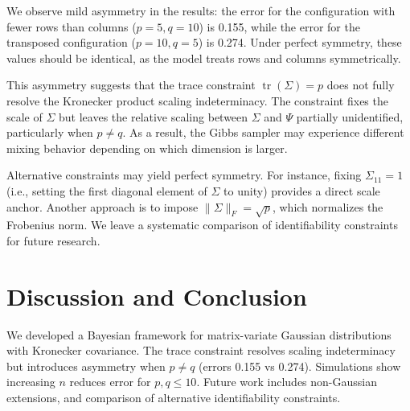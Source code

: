 \documentclass[twoside]{article}
\begin{document}
\noindent We observe mild asymmetry in the results: the error for the configuration with fewer rows than columns ($p=5,q=10$) is 0.155, while the error for the transposed configuration ($p=10,q=5$) is 0.274. Under perfect symmetry, these values should be identical, as the model treats rows and columns symmetrically.

\noindent This asymmetry suggests that the trace constraint $\operatorname{tr}(\Sigma)=p$ does not fully resolve the Kronecker product scaling indeterminacy. The constraint fixes the scale of $\Sigma$ but leaves the relative scaling between $\Sigma$ and $\Psi$ partially unidentified, particularly when $p \neq q$. As a result, the Gibbs sampler may experience different mixing behavior depending on which dimension is larger.

\noindent Alternative constraints may yield perfect symmetry. For instance, fixing $\Sigma_{11}=1$ (i.e., setting the first diagonal element of $\Sigma$ to unity) provides a direct scale anchor. Another approach is to impose $\|\Sigma\|_F = \sqrt{p}$, which normalizes the Frobenius norm. We leave a systematic comparison of identifiability constraints for future research.

\section*{Discussion and Conclusion}
We developed a Bayesian framework for matrix-variate Gaussian distributions with Kronecker covariance. The trace constraint resolves scaling indeterminacy but introduces asymmetry when $p \neq q$ (errors 0.155 vs 0.274). Simulations show increasing $n$ reduces error for $p,q \leq 10$. Future work includes non-Gaussian extensions, and comparison of alternative identifiability constraints.
\end{document}
